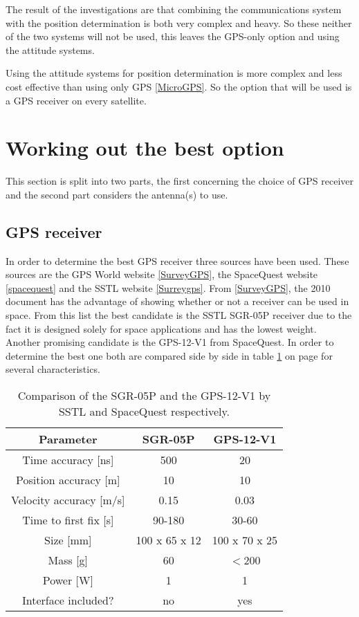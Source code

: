 \documentclass[11pt]{report}
\begin{document}
The result of the investigations are that combining the communications system with the position determination is both very complex and heavy. So these neither of the two systems will not be used, this leaves the \acs{GPS}-only option and using the attitude systems.

Using the attitude systems for position determination is more complex and less cost effective than using only \acs{GPS} \ref{MicroGPS}. So the option that will be used is a \acs{GPS} receiver on every satellite.

\section{Working out the best option}
\label{navi3}
This section is split into two parts, the first concerning the choice of \acs{GPS} receiver and the second part considers the antenna(s) to use.

\subsection{GPS receiver}
In order to determine the best \acs{GPS} receiver three sources have been used. These sources are the GPS World website \ref{SurveyGPS}, the SpaceQuest website \ref{spacequest} and the \ac{SSTL} website \ref{Surreygps}. From \ref{SurveyGPS}, the 2010 document has the advantage of showing whether or not a receiver can be used in space. From this list the best candidate is the \acs{SSTL} SGR-05P receiver due to the fact it is designed solely for space applications and has the lowest weight. Another promising candidate is the GPS-12-V1 from SpaceQuest. In order to determine the best one both are compared side by side in table \ref{comparegps} on page \pageref{comparegps} for several characteristics.

\begin{table}
\centering
\begin{tabular}{c||c|c}
\textbf{Parameter} & \textbf{SGR-05P} & \textbf{GPS-12-V1} \\\hline\hline
	Time accuracy [ns] & 500 & 20 \\
	Position accuracy [m] & 10 & 10 \\
	Velocity accuracy [m/s] & 0.15 & 0.03 \\
	Time to first fix [s] & 90-180 & 30-60 \\
	Size [mm] & 100 x 65 x 12 & 100 x 70 x 25\\
	Mass [g] & 60 & $<$200 \\
	Power [W] & 1 & 1 \\
	Interface included? & no & yes \\
\end{tabular}
\caption{Comparison of the SGR-05P and the GPS-12-V1 by \acs{SSTL} and SpaceQuest respectively.}
\label{comparegps}
\end{table}
\end{document}
